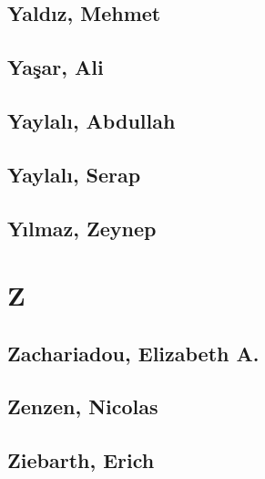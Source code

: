 \subsection[Yaldız, Mehmet (1)]{Yaldız, Mehmet}

\subsection[Yaşar, Ali (2)]{Yaşar, Ali}


\subsection[Yaylalı, Abdullah (1)]{Yaylalı, Abdullah}

\subsection[Yaylalı, Serap (1)]{Yaylalı, Serap}

\subsection[Yılmaz, Zeynep (1)]{Yılmaz, Zeynep}

\section{Z}

\subsection[Zachariadou, Elizabeth A. (1)]{Zachariadou, Elizabeth A.}

\subsection[Zenzen, Nicolas (1)]{Zenzen, Nicolas}

\subsection[Ziebarth, Erich (1)]{Ziebarth, Erich}

